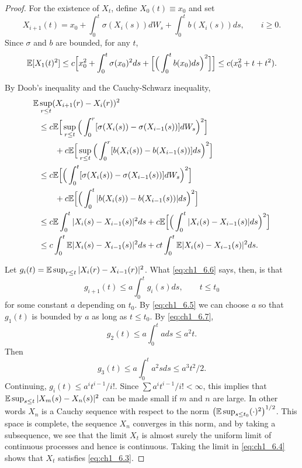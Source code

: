 \begin{proof}
For the existence of $X_t$, define $X_0(t) \equiv x_0$ and set
\begin{equation}\label{eq:ch1_6.4}
    X_{i+1}(t) = x_0 + \int_0^t \sigma(X_i(s))dW_s + \int_0^t b(X_i(s))ds, \qquad i \geq 0.
\end{equation}
Since $\sigma$ and $b$ are bounded, for any $t$,
\mpagebreak
\begin{equation}\label{eq:ch1_6.5}
    \mathbb{E}[X_1(t)^2] \leq c\Big[x_0^2 + \int_0^t \sigma(x_0)^2ds + \Big[\Big(\int_0^t b(x_0) ds\Big)^2\Big]\Big] \leq c(x_0^2 + t + t^2).
\end{equation}

By Doob's inequality and the Cauchy-Schwarz inequality,
\begin{align}\label{eq:ch1_6.6}
\mathbb{E} &\sup_{r\leq t} (X_{i+1}(r) - X_i(r))^2 \\
    &\leq c\mathbb{E}\Big[\sup_{r\leq t}\Big(\int_0^r [\sigma(X_i(s)) - \sigma(X_{i-1}(s))]dW_s\Big)^2\Big] \notag \\
    &\qquad+ c\mathbb{E}\Big[\sup_{r\leq t}\Big(\int_0^r [b(X_i(s)) - b(X_{i-1}(s))]ds\Big)^2\Big] \notag \\
    &\leq c\mathbb{E}\Big[\Big(\int_0^t [\sigma(X_i(s)) - \sigma(X_{i-1}(s))]dW_s\Big)^2\Big] \notag \\
    &\qquad+ c\mathbb{E}\Big[\Big(\int_0^t |b(X_i(s)) - b(X_{i-1}(s))|ds\Big)^2\Big] \notag \\
    &\leq c\mathbb{E} \int_0^t |X_i(s) - X_{i-1}(s)|^2ds + c\mathbb{E}\Big[\Big(\int_0^t |X_i(s) - X_{i-1}(s)|ds\Big)^2\Big] \notag \\
    &\leq c \int_0^t \mathbb{E}|X_i(s) - X_{i-1}(s)|^2ds + ct\int_0^t \mathbb{E}|X_i(s) - X_{i-1}(s)|^2 ds. \notag
\end{align}

Let $g_i(t) = \mathbb{E} \sup_{r\leq t} |X_i(r) - X_{i-1}(r)|^2$. What \eqref{eq:ch1_6.6} says, then, is that
\begin{equation}\label{eq:ch1_6.7}
    g_{i+1}(t) \leq a \int_0^t g_i(s)ds, \qquad t \leq t_0
\end{equation}
for some constant $a$ depending on $t_0$. By \eqref{eq:ch1_6.5} we can choose $a$ so that $g_1(t)$ is bounded by $a$ as long as $t \leq t_0$. By \eqref{eq:ch1_6.7},
\[
    g_2(t) \leq a \int_0^t a ds \leq a^2t.
\]
Then
\[
    g_3(t) \leq a \int_0^t a^2s ds \leq a^3t^2/2.
\]
Continuing, $g_i(t) \leq a^i t^{i-1}/i!$. Since $\sum a^i t^{i-1}/i! < \infty$, this implies that $\mathbb{E} \sup_{s\leq t} |X_m(s) - X_n(s)|^2$ can be made small if $m$ and $n$ are large. In other words $X_n$ is a Cauchy sequence with respect to the norm $\big(\mathbb{E} \sup_{s\leq t_0} (\cdot)^2\big)^{1/2}$. This space is complete, the sequence $X_n$ converges in this norm, and by taking a subsequence, we see that the limit $X_t$ is almost surely the uniform limit of continuous processes and hence is continuous. Taking the limit in \eqref{eq:ch1_6.4} shows that $X_t$ satisfies \eqref{eq:ch1_6.3}.


\end{proof}
